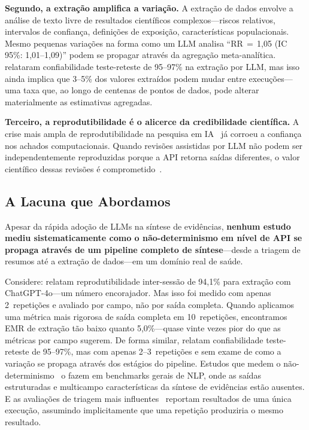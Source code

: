 \documentclass[12pt, a4paper]{article}
\begin{document}
\textbf{Segundo, a extração amplifica a variação.}
A extração de dados envolve a análise de texto livre de resultados científicos complexos---riscos relativos, intervalos de confiança, definições de exposição, características populacionais.
Mesmo pequenas variações na forma como um LLM analisa ``RR$\,{=}\,$1,05 (IC 95\%: 1,01--1,09)'' podem se propagar através da agregação meta-analítica.
\citet{gartlehner2024extraction} relataram confiabilidade teste-reteste de 95--97\% na extração por LLM, mas isso ainda implica que 3--5\% dos valores extraídos podem mudar entre execuções---uma taxa que, ao longo de centenas de pontos de dados, pode alterar materialmente as estimativas agregadas.

\textbf{Terceiro, a reprodutibilidade é o alicerce da credibilidade científica.}
A crise mais ampla de reprodutibilidade na pesquisa em IA~\citep{hutson2018science, haibe2020nature, kapoor2023leakage} já corroeu a confiança nos achados computacionais.
Quando revisões assistidas por LLM não podem ser independentemente reproduzidas porque a API retorna saídas diferentes, o valor científico dessas revisões é comprometido~\citep{han2025biomedical, desai2025reproducibility, semmelrock2025barriers}.

\subsection{A Lacuna que Abordamos}

Apesar da rápida adoção de LLMs na síntese de evidências, \textbf{nenhum estudo mediu sistematicamente como o não-determinismo em nível de API se propaga através de um pipeline completo de síntese}---desde a triagem de resumos até a extração de dados---em um domínio real de saúde.

Considere: \citet{jensen2025chatgpt} relatam reprodutibilidade inter-sessão de 94,1\% para extração com ChatGPT-4o---um número encorajador.
Mas isso foi medido com apenas 2~repetições e avaliado por campo, não por saída completa.
Quando aplicamos uma métrica mais rigorosa de saída completa em 10~repetições, encontramos EMR de extração tão baixo quanto 5,0\%---quase vinte vezes pior do que as métricas por campo sugerem.
De forma similar, \citet{gartlehner2024extraction} relatam confiabilidade teste-reteste de 95--97\%, mas com apenas 2--3~repetições e sem exame de como a variação se propaga através dos estágios do pipeline.
Estudos que medem o não-determinismo~\citep{atil2024nondeterminism, klishevich2025codereview} o fazem em benchmarks gerais de NLP, onde as saídas estruturadas e multicampo características da síntese de evidências estão ausentes.
E as avaliações de triagem mais influentes~\citep{oami2024screening, khraisha2024gpt4, matsui2024screening} reportam resultados de uma única execução, assumindo implicitamente que uma repetição produziria o mesmo resultado.
\end{document}
